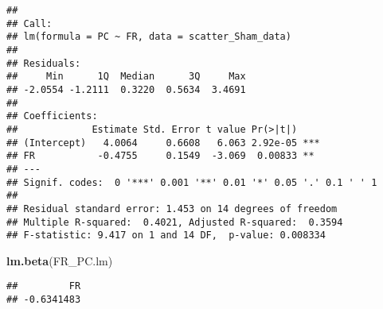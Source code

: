 \documentclass[
]{article}
\newenvironment{Shaded}{\begin{snugshade}}{\end{snugshade}}
\newcommand{\CommentTok}[1]{\textcolor[rgb]{0.56,0.35,0.01}{\textit{#1}}}
\newcommand{\DataTypeTok}[1]{\textcolor[rgb]{0.13,0.29,0.53}{#1}}
\newcommand{\DecValTok}[1]{\textcolor[rgb]{0.00,0.00,0.81}{#1}}
\newcommand{\FloatTok}[1]{\textcolor[rgb]{0.00,0.00,0.81}{#1}}
\newcommand{\KeywordTok}[1]{\textcolor[rgb]{0.13,0.29,0.53}{\textbf{#1}}}
\newcommand{\NormalTok}[1]{#1}
\newcommand{\OperatorTok}[1]{\textcolor[rgb]{0.81,0.36,0.00}{\textbf{#1}}}
\newcommand{\OtherTok}[1]{\textcolor[rgb]{0.56,0.35,0.01}{#1}}
\newcommand{\StringTok}[1]{\textcolor[rgb]{0.31,0.60,0.02}{#1}}
\begin{document}
\begin{verbatim}
## 
## Call:
## lm(formula = PC ~ FR, data = scatter_Sham_data)
## 
## Residuals:
##     Min      1Q  Median      3Q     Max 
## -2.0554 -1.2111  0.3220  0.5634  3.4691 
## 
## Coefficients:
##             Estimate Std. Error t value Pr(>|t|)    
## (Intercept)   4.0064     0.6608   6.063 2.92e-05 ***
## FR           -0.4755     0.1549  -3.069  0.00833 ** 
## ---
## Signif. codes:  0 '***' 0.001 '**' 0.01 '*' 0.05 '.' 0.1 ' ' 1
## 
## Residual standard error: 1.453 on 14 degrees of freedom
## Multiple R-squared:  0.4021, Adjusted R-squared:  0.3594 
## F-statistic: 9.417 on 1 and 14 DF,  p-value: 0.008334
\end{verbatim}

\begin{Shaded}
\begin{Highlighting}[]
\KeywordTok{lm.beta}\NormalTok{(FR_PC.lm)}
\end{Highlighting}
\end{Shaded}

\begin{verbatim}
##         FR 
## -0.6341483
\end{verbatim}

\begin{Shaded}
\end{Shaded}
\end{document}
